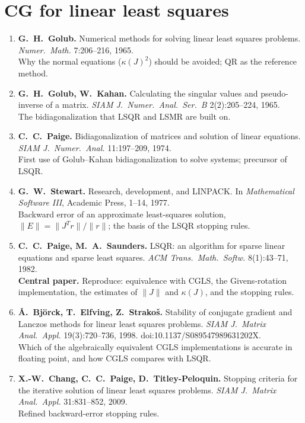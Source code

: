 \documentclass[11pt,a4paper]{article}
\begin{document}
\section{CG for linear least squares}
\begin{enumerate}[resume]
\item \textbf{G.~H.~Golub.} Numerical methods for solving linear least squares problems. \emph{Numer.\ Math.} 7:206--216, 1965.\\
Why the normal equations ($\kappa(J)^2$) should be avoided; QR as the reference method.

\item \textbf{G.~H.~Golub, W.~Kahan.} Calculating the singular values and pseudo-inverse of a matrix. \emph{SIAM J.\ Numer.\ Anal.\ Ser.~B} 2(2):205--224, 1965.\\
The bidiagonalization that LSQR and LSMR are built on.

\item \textbf{C.~C.~Paige.} Bidiagonalization of matrices and solution of linear equations. \emph{SIAM J.\ Numer.\ Anal.} 11:197--209, 1974.\\
First use of Golub--Kahan bidiagonalization to solve systems; precursor of LSQR.

\item \textbf{G.~W.~Stewart.} Research, development, and LINPACK. In \emph{Mathematical Software III}, Academic Press, 1--14, 1977.\\
Backward error of an approximate least-squares solution, $\|E\|=\|J^Tr\|/\|r\|$; the basis of the LSQR stopping rules.

\item \textbf{C.~C.~Paige, M.~A.~Saunders.} LSQR: an algorithm for sparse linear equations and sparse least squares. \emph{ACM Trans.\ Math.\ Softw.} 8(1):43--71, 1982.\\
\textbf{Central paper.} Reproduce: equivalence with CGLS, the Givens-rotation implementation, the estimates of $\|J\|$ and $\kappa(J)$, and the stopping rules.

\item \textbf{Å.~Björck, T.~Elfving, Z.~Strakoš.} Stability of conjugate gradient and Lanczos methods for linear least squares problems. \emph{SIAM J.\ Matrix Anal.\ Appl.} 19(3):720--736, 1998. doi:10.1137/S089547989631202X.\\
Which of the algebraically equivalent CGLS implementations is accurate in floating point, and how CGLS compares with LSQR.

\item \textbf{X.-W.~Chang, C.~C.~Paige, D.~Titley-Peloquin.} Stopping criteria for the iterative solution of linear least squares problems. \emph{SIAM J.\ Matrix Anal.\ Appl.} 31:831--852, 2009.\\
Refined backward-error stopping rules.


\end{enumerate}
\end{document}
